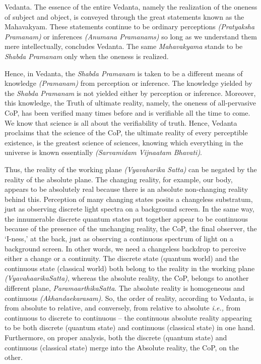 \documentclass[twoside, 13pt]{article}
\begin{document}
{{Vedanta. The essence of the entire Vedanta, namely the realization of the oneness of subject and object, is conveyed through the great statements known as the Mahavakyam. These statements continue to be ordinary perceptions \textit{(Pratyaksha Pramanam)} or inferences \textit{(Anumana Pramanams)} so long as we understand them mere intellectually, concludes Vedanta. The same \textit{Mahavakyama} stands to be \textit{Shabda Pramanam} only when the oneness is realized. 

Hence, in Vedanta, the \textit{Shabda Pramanam} is taken to be a different means of knowledge \textit{(Pramanam)} from perception or inference. The knowledge yielded by the \textit{Shabda Pramanam} is not yielded either by perception or inference. Moreover, this knowledge, the Truth of ultimate reality, namely, the oneness of all-pervasive CoP, has been verified many times before and is verifiable all the time to come. We know that science is all about the verifiability of truth. Hence, Vedanta proclaims that the science of the CoP, the ultimate reality of every perceptible existence, is the greatest science of sciences, knowing which everything in the universe is known essentially \textit{(Sarvamidam Vijnaatam Bhavati)}.

Thus, the reality of the working plane \textit{(Vyavaharika Satta)} can be negated by the reality of the absolute plane. The changing reality, for example, our body, appears to be absolutely real because there is an absolute non-changing reality behind this. Perception of many changing states posits a changeless substratum, just as observing discrete light spectra on a background screen. In the same way, the innumerable discrete quantum states put together appear to be continuous because of the presence of the unchanging reality, the CoP, the final observer, the ‘I-ness,’ at the back, just as observing a continuous spectrum of light on a background screen. In other words, we need a changeless backdrop to perceive either a change or a continuity. The discrete state (quantum world) and the continuous state (classical world) both belong to the reality in the working plane \textit{(VyavahaarikaSatta)}, whereas the absolute reality, the CoP, belongs to another different plane, \textit{ParamaarthikaSatta}. The absolute reality is homogeneous and continuous \textit{(Akhandaekarasam)}. So, the order of reality, according to Vedanta, is from absolute to relative, and conversely, from relative to absolute {\it i.e.,} from continuous to discrete to continuous – the continuous absolute reality appearing to be both discrete (quantum state) and continuous (classical state) in one hand. Furthermore, on proper analysis, both the discrete (quantum state) and continuous (classical state) merge into the Absolute reality, the CoP, on the other.

}}
\end{document}

